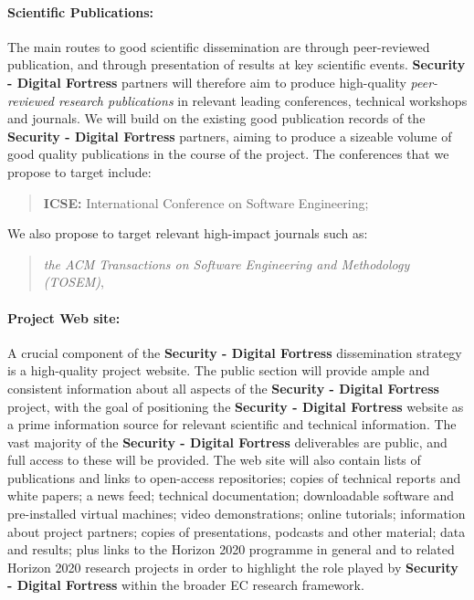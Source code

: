 \documentclass[a4paper,11pt]{article}
\newcommand{\project}[1]{\textbf{#1}\xspace}
\newcommand{\SECURITY}{\project{Security - Digital Fortress}}
\newcommand{\TheProject}{\SECURITY}
\begin{document}
\paragraph{Scientific Publications:}  The main routes to good scientific dissemination are
through peer-reviewed publication, and through presentation of results at key scientific events.
\TheProject{} partners will therefore aim to produce high-quality \emph{peer-reviewed
research publications} in relevant leading
conferences, technical workshops and journals.
We will build on the existing good publication records of the \TheProject{} partners,
aiming to produce a sizeable volume of good quality publications in the course of the project. 
%
\noindent
The conferences that we propose to target include:

\begin{quote}
\textbf{ICSE:} International Conference on Software Engineering;
 \end{quote}

\noindent
We also propose to target relevant high-impact journals such as:
\begin{quote}
\emph{the ACM Transactions on Software Engineering and Methodology (TOSEM)}, 
\end{quote}

\paragraph{Project Web site:}  
A crucial component of the \TheProject{} dissemination strategy is a
high-quality project website. The public section will provide ample
and consistent information about all aspects of the \TheProject{}
project, with the goal of positioning the \TheProject{} website as a
prime information source for relevant scientific and technical
information.  The vast majority of the \TheProject{} deliverables are
public, and full access to these will be provided.  The web site will also contain lists of publications and links
to open-access repositories; copies of technical reports and white
papers; a news feed; technical documentation; downloadable software
and pre-installed virtual machines; video demonstrations; online
tutorials; information about project partners; copies of
presentations, podcasts and other material; data and results; plus
links to the Horizon 2020 programme in general and to related 
Horizon 2020 research projects in order to highlight the role played by \TheProject{} within the
broader EC research framework.
\end{document}
